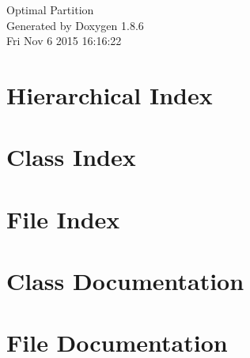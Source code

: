 \documentclass[twoside]{book}
\newcommand{\clearemptydoublepage}{%
  \newpage{\pagestyle{empty}\cleardoublepage}%
}
\begin{document}
\hypersetup{pageanchor=false}
\begin{titlepage}
\vspace*{7cm}
\begin{center}%
{\Large Optimal Partition }\\
\vspace*{1cm}
{\large Generated by Doxygen 1.8.6}\\
\vspace*{0.5cm}
{\small Fri Nov 6 2015 16:16:22}\\
\end{center}
\end{titlepage}
\clearemptydoublepage
\tableofcontents
\clearemptydoublepage
{}
\hypersetup{pageanchor=true}

\chapter{Hierarchical Index}

\chapter{Class Index}

\chapter{File Index}

\chapter{Class Documentation}














































\chapter{File Documentation}



\newpage
{}
{}
\printindex
\end{document}
